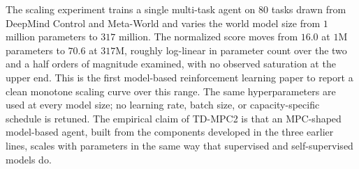 The scaling experiment trains a single multi-task agent on $80$ tasks drawn from DeepMind Control and Meta-World and varies the world model size from $1$ million parameters to $317$ million. The normalized score moves from $16.0$ at $1$M parameters to $70.6$ at $317$M, roughly log-linear in parameter count over the two and a half orders of magnitude examined, with no observed saturation at the upper end. This is the first model-based reinforcement learning paper to report a clean monotone scaling curve over this range. The same hyperparameters are used at every model size; no learning rate, batch size, or capacity-specific schedule is retuned. The empirical claim of TD-MPC2 is that an MPC-shaped model-based agent, built from the components developed in the three earlier lines, scales with parameters in the same way that supervised and self-supervised models do.
